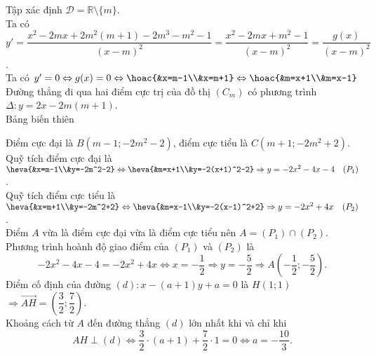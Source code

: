 \begin{Solbook}{15}
 \par \noindent  Tập xác định $\mathscr {D}=\mathbb {R}\setminus \{m\}$.\\ Ta có $y'=\dfrac {x^2-2mx+2m^2(m+1)-2m^3-m^2-1}{(x-m)^2}=\dfrac {x^2-2mx+m^2-1}{(x-m)^2}=\dfrac {g(x)}{(x-m)^2}$.\\ Ta có $y'=0\Leftrightarrow g(x)=0\Leftrightarrow \hoac {&x=m-1\\&x=m+1}\Leftrightarrow \hoac {&m=x+1\\&m=x-1}$\\ Đường thẳng đi qua hai điểm cực trị của đồ thị $(C_m)$ có phương trình $\Delta \colon y=2x-2m(m+1)$.\\ Bảng biến thiên \begin {center}  \end {center} Điểm cực đại là $B(m-1;-2m^2-2)$, điểm cực tiểu là $C(m+1;-2m^2+2)$.\\ Quỹ tích điểm cực đại là $\heva {&x=m-1\\&y=-2m^2-2}\Leftrightarrow \heva {&m=x+1\\&y=-2(x+1)^2-2}\Rightarrow y=-2x^2-4x-4 \quad (P_1)$.\\ Quỹ tích điểm cực tiểu là $\heva {&x=m+1\\&y=-2m^2+2}\Leftrightarrow \heva {&m=x-1\\&y=-2(x-1)^2+2}\Rightarrow y=-2x^2+4x\quad (P_2)$.\\ Điểm $A$ vừa là điểm cực đại vừa là điểm cực tiểu nên $A=(P_1)\cap (P_2)$.\\ Phương trình hoành độ giao điểm của $(P_1)$ và $(P_2)$ là $$-2x^2-4x-4=-2x^2+4x\Leftrightarrow x=-\dfrac {1}{2}\Rightarrow y=-\dfrac {5}{2}\Rightarrow A\left (-\dfrac {1}{2};-\dfrac {5}{2}\right ).$$ Điểm cố định của đường $(d)\colon x-(a+1)y+a=0$ là $H(1;1)$ $\Rightarrow \overrightarrow {AH}=\left (\dfrac {3}{2};\dfrac {7}{2}\right )$.\\ Khoảng cách từ $A$ đến đường thẳng $(d)$ lớn nhất khi và chỉ khi $$AH\perp (d)\Leftrightarrow \dfrac {3}{2}\cdot (a+1)+\dfrac {7}{2}\cdot 1=0\Leftrightarrow a=-\dfrac {10}{3}.$$  \par \noindent \selectD \hfill \qedEX 
\end{Solbook}
